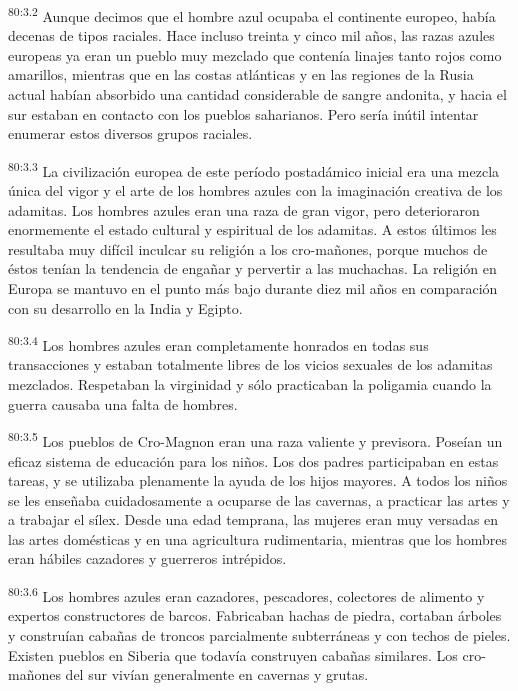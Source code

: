 \par
\textsuperscript{80:3.2} Aunque decimos que el hombre azul ocupaba el continente europeo, había decenas de tipos raciales. Hace incluso treinta y cinco mil años, las razas azules europeas ya eran un pueblo muy mezclado que contenía linajes tanto rojos como amarillos, mientras que en las costas atlánticas y en las regiones de la Rusia actual habían absorbido una cantidad considerable de sangre andonita, y hacia el sur estaban en contacto con los pueblos saharianos. Pero sería inútil intentar enumerar estos diversos grupos raciales.

\par
\textsuperscript{80:3.3} La civilización europea de este período postadámico inicial era una mezcla única del vigor y el arte de los hombres azules con la imaginación creativa de los adamitas. Los hombres azules eran una raza de gran vigor, pero deterioraron enormemente el estado cultural y espiritual de los adamitas. A estos últimos les resultaba muy difícil inculcar su religión a los cro-mañones, porque muchos de éstos tenían la tendencia de engañar y pervertir a las muchachas. La religión en Europa se mantuvo en el punto más bajo durante diez mil años en comparación con su desarrollo en la India y Egipto.

\par
\textsuperscript{80:3.4} Los hombres azules eran completamente honrados en todas sus transacciones y estaban totalmente libres de los vicios sexuales de los adamitas mezclados. Respetaban la virginidad y sólo practicaban la poligamia cuando la guerra causaba una falta de hombres.

\par
\textsuperscript{80:3.5} Los pueblos de Cro-Magnon eran una raza valiente y previsora. Poseían un eficaz sistema de educación para los niños. Los dos padres participaban en estas tareas, y se utilizaba plenamente la ayuda de los hijos mayores. A todos los niños se les enseñaba cuidadosamente a ocuparse de las cavernas, a practicar las artes y a trabajar el sílex. Desde una edad temprana, las mujeres eran muy versadas en las artes domésticas y en una agricultura rudimentaria, mientras que los hombres eran hábiles cazadores y guerreros intrépidos.

\par
\textsuperscript{80:3.6} Los hombres azules eran cazadores, pescadores, colectores de alimento y expertos constructores de barcos. Fabricaban hachas de piedra, cortaban árboles y construían cabañas de troncos parcialmente subterráneas y con techos de pieles. Existen pueblos en Siberia que todavía construyen cabañas similares. Los cro-mañones del sur vivían generalmente en cavernas y grutas.

